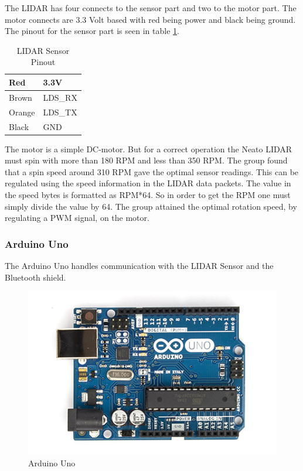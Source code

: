 The LIDAR has four connects to the sensor part and two to the motor part. The motor connects are 3.3 Volt based with red being power and black being ground. The pinout for the sensor part is seen in table \ref{tab:lidars}.
\begin{table}[H]
\centering
\begin{tabular}{|l|l|}
\hline
Red & 3.3V \\ \hline
Brown & LDS\_RX \\ \hline
Orange & LDS\_TX \\ \hline
Black & GND \\ \hline
\end{tabular}
\caption{LIDAR Sensor Pinout}
\label{tab:lidars}
\end{table}

The motor is a simple DC-motor. But for a correct operation the Neato LIDAR must spin with more than 180 RPM and less than 350 RPM. The group found that a spin speed around 310 RPM gave the optimal sensor readings. This can be regulated using the speed information in the LIDAR data packets. The value in the speed bytes is formatted as RPM*64. So in order to get the RPM one must simply divide the value by 64. The group attained the optimal rotation speed, by regulating a PWM signal, on the motor. 

\subsubsection{Arduino Uno}
The Arduino Uno\cite{ArduinoUno} handles communication with the LIDAR Sensor and the Bluetooth shield.

\begin{figure}[H]
\centering
\includegraphics[scale=1]{billeder/ArduinoUno}
\caption{Arduino Uno}
\label{fig:ArduinoUno}
\end{figure}

